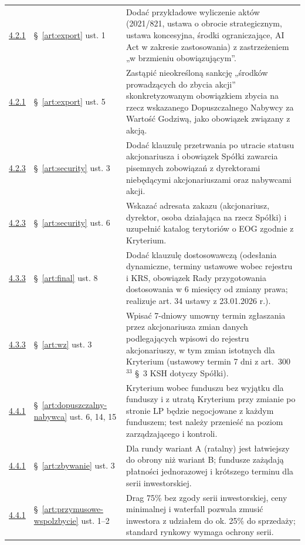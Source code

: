\documentclass[12pt,a4paper]{report}
\begin{document}
\begin{longtable}{@{}p{1.3cm} p{3.3cm} p{9.6cm}@{}}
\hyperref[memo:4.2.1]{4.2.1} & §~\ref{art:export} ust. 1 & Dodać przykładowe wyliczenie aktów (2021/821, ustawa o obrocie strategicznym, ustawa koncesyjna, środki ograniczające, AI Act w zakresie zastosowania) z zastrzeżeniem „w brzmieniu obowiązującym”. \\
\hyperref[memo:4.2.1]{4.2.1} & §~\ref{art:export} ust. 5 & Zastąpić nieokreśloną sankcję „środków prowadzących do zbycia akcji” skonkretyzowanym obowiązkiem zbycia na rzecz wskazanego Dopuszczalnego Nabywcy za Wartość Godziwą, jako obowiązek związany z akcją. \\
\hyperref[memo:4.2.3]{4.2.3} & §~\ref{art:security} ust. 3 & Dodać klauzulę przetrwania po utracie statusu akcjonariusza i obowiązek Spółki zawarcia pisemnych zobowiązań z dyrektorami niebędącymi akcjonariuszami oraz nabywcami akcji. \\
\hyperref[memo:4.2.3]{4.2.3} & §~\ref{art:security} ust. 6 & Wskazać adresata zakazu (akcjonariusz, dyrektor, osoba działająca na rzecz Spółki) i uzupełnić katalog terytoriów o EOG zgodnie z Kryterium. \\
\hyperref[memo:4.3.3]{4.3.3} & §~\ref{art:final} ust. 8 & Dodać klauzulę dostosowawczą (odesłania dynamiczne, terminy ustawowe wobec rejestru i KRS, obowiązek Rady przygotowania dostosowania w 6 miesięcy od zmiany prawa; realizuje art. 34 ustawy z 23.01.2026 r.). \\
\hyperref[memo:4.3.3]{4.3.3} & §~\ref{art:wz} ust. 3 & Wpisać 7-dniowy umowny termin zgłaszania przez akcjonariusza zmian danych podlegających wpisowi do rejestru akcjonariuszy, w tym zmian istotnych dla Kryterium (ustawowy termin 7 dni z art.~300$^{33}$ §~3 KSH dotyczy Spółki). \\
\hyperref[memo:4.4.1]{4.4.1} & §~\ref{art:dopuszczalny-nabywca} ust. 6, 14, 15 & Kryterium wobec funduszu bez wyjątku dla funduszy i z utratą Kryterium przy zmianie po stronie LP będzie negocjowane z każdym funduszem; test należy przenieść na poziom zarządzającego i kontroli. \\
\hyperref[memo:4.4.1]{4.4.1} & §~\ref{art:zbywanie} ust. 3 & Dla rundy wariant A (ratalny) jest łatwiejszy do obrony niż wariant B; fundusze zażądają płatności jednorazowej i krótszego terminu dla serii inwestorskiej. \\
\hyperref[memo:4.4.1]{4.4.1} & §~\ref{art:przymusowe-wspolzbycie} ust. 1--2 & Drag 75\% bez zgody serii inwestorskiej, ceny minimalnej i waterfall pozwala zmusić inwestora z udziałem do ok. 25\% do sprzedaży; standard rynkowy wymaga ochrony serii. \\

\end{longtable}
\end{document}
